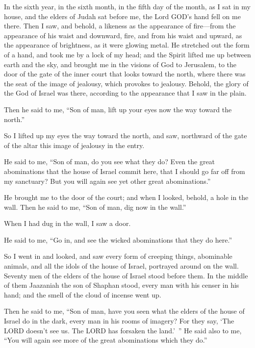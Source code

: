 \mychapter{} \myverse*{}In the sixth year, in the sixth month, in the fifth day of the
month, as I sat in my house, and the elders of Judah sat before me, the Lord GOD’s hand fell on me there.
\myverse{}Then I saw, and behold, a likeness as the appearance of fire—from the appearance
of his waist and downward, fire, and from his waist and upward, as the appearance of brightness, as it
were glowing metal.
\myverse{}He stretched out the form of a hand, and took me by a lock of my head; and the
Spirit lifted me up between earth and the sky, and brought me in the visions of God to Jerusalem, to the
door of the gate of the inner court that looks toward the north, where there was the seat of the image
of jealousy, which provokes to jealousy.
\myverse{}Behold, the glory of the God of Israel was there, according to the appearance
that I saw in the plain.

\myverse{}Then he said to me, “Son of man, lift up your eyes now the way
toward the north.”

So I lifted up my eyes the way toward the north, and saw, northward of the gate of the altar
this image of jealousy in the entry.

\myverse{}He said to me, “Son of man, do you see what they do? Even the great
abominations that the house of Israel commit here, that I should go far off from my sanctuary? But you
will again see yet other great abominations.”

\myverse{}He brought me to the door of the court; and when I looked, behold,
a hole in the wall.
\myverse{}Then he said to me, “Son of man, dig now in the wall.”

When I had dug in the wall, I saw a door.

\myverse{}He said to me, “Go in, and see the wicked abominations that they
do here.”

\myverse{}So I went in and looked, and saw every form of creeping things,
abominable animals, and all the idols of the house of Israel, portrayed around on the wall.
\myverse{}Seventy men of the elders of the house of Israel stood before them. In the
middle of them Jaazaniah the son of Shaphan stood, every man with his censer in his hand; and the smell
of the cloud of incense went up.

\myverse{}Then he said to me, “Son of man, have you seen what the elders
of the house of Israel do in the dark, every man in his rooms of imagery? For they say, ‘The LORD doesn’t
see us. The LORD has forsaken the land.’ ”
\myverse{}He said also to me, “You will again see more of the great abominations which
they do.”


